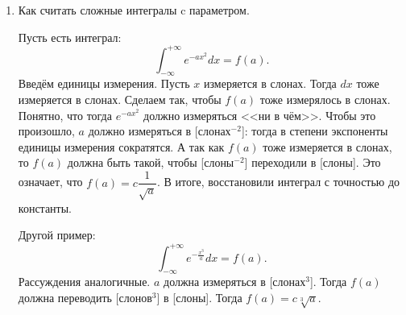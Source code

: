 \documentclass[10pt, a4paper]{extarticle}
\begin{document}
\begin{enumerate}
	 \item Как считать сложные интегралы c параметром. 
	 
	 Пусть есть интеграл:
	 \[
	 \int_{-\infty}^{+\infty}e^{-ax^2}dx = f(a).
	 \]
	 Введём единицы измерения. Пусть $x$ измеряется в слонах. Тогда $dx$ тоже измеряется в слонах. Сделаем так, чтобы $f(a)$ тоже измерялось в слонах. Понятно, что тогда $e^{-ax^2}$ должно измеряться <<ни в чём>>. Чтобы это произошло, $a$ должно измеряться в [слонах$^{-2}$]: тогда в степени экспоненты единицы измерения сократятся. А так как $f(a)$ тоже измеряется в слонах, то $f(a)$ должна быть такой, чтобы [слоны$^{-2}$] переходили в [слоны]. Это означает, что $f(a) = c \dfrac{1}{\sqrt{a}}$. В итоге, восстановили интеграл с точностью до константы.
	 
	 Другой пример:
	 \[
	  \int_{-\infty}^{+\infty}e^{-\frac{x^3}{a}}dx = f(a).
	 \]
	 Рассуждения аналогичные. $a$ должна измеряться в [слонах$^{3}$]. Тогда $f(a)$ должна переводить [слонов$^{3}$] в [слоны]. Тогда $f(a) = c\sqrt[3]{a}$.
\end{enumerate}
\end{document}
